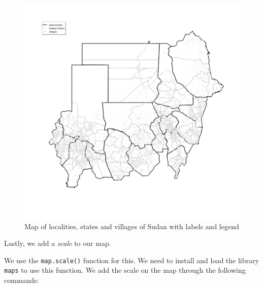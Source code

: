 \documentclass[12pt,a4paper,a4paper]{book}
\theoremstyle{definition}
\theoremstyle{definition}
\theoremstyle{definition}
\theoremstyle{remark}
\begin{document}
\begin{figure}[H]

{\centering \includegraphics{figures/map7-1} 

}

\caption{Map of localities, states and villages of Sudan with labels and legend}\label{fig:map7}
\end{figure}

\newpage

Lastly, we add a \emph{scale} to our map.

We use the \texttt{map.scale()} function for this. We need to install
and load the library \texttt{maps} to use this function. We add the
scale on the map through the following commands:

~
\end{document}
